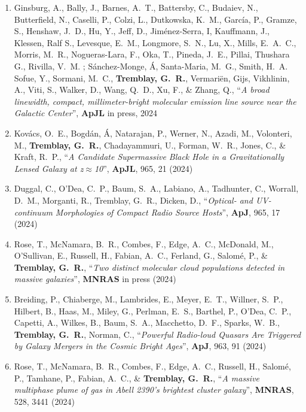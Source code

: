 \documentclass[11pt]{article}
\begin{document}
\begin{enumerate}[resume]

\item Ginsburg, A., Bally, J., Barnes, A.~T., Battersby, C., Budaiev, N., Butterfield, N., Caselli, P., Colzi, L.,  Dutkowska, K.~M., Garc\'{i}a, P.,  Gramze, S.,  Henshaw, J.~D., Hu, Y.,  Jeff, D., Jim\'{e}nez-Serra, I, Kauffmann, J., Klessen, Ralf S., Levesque, E.~M., Longmore, S.~N., Lu, X., Mills, E.~A.~C., Morris, M.~R., Nogueras-Lara, F., Oka, T.,  Pineda, J.~E., Pillai, Thushara G.,  Rivilla, V.~M. ; S\'{a}nchez-Monge, \'{A}, Santa-Maria, M.~G., Smith, H.~A. Sofue, Y., Sormani, M.~C., \textbf{Tremblay, G.~R.}, Vermari\"{e}n, Gijs, Vikhlinin, A., Viti, S., Walker, D., Wang, Q.~D., Xu, F., \& Zhang, Q., ``\textit{A broad linewidth, compact, millimeter-bright molecular emission line source near the Galactic Center}'', \textbf{ApJL} in press, 2024

\item Kov\'{a}cs, O.~E., Bogd\'{a}n, \'{A}, Natarajan, P., Werner, N., Azadi, M., Volonteri, M., \textbf{Tremblay, G.~R.}, Chadayammuri, U., Forman, W.~R., Jones, C., \& Kraft, R.~P., ``\textit{A Candidate Supermassive Black Hole in a Gravitationally Lensed Galaxy at z$\approx$10}'', \textbf{ApJL}, 965, 21 (2024)

\item Duggal, C., O'Dea, C.~P., Baum, S.~A., Labiano, A., Tadhunter, C.,  Worrall, D.~M.,  Morganti, R., Tremblay, G.~R., Dicken, D., ``\textit{Optical- and UV-continuum Morphologies of Compact Radio Source Hosts}'', \textbf{ApJ}, 965, 17 (2024)

\item Rose, T., McNamara, B.~R., Combes, F., Edge, A.~C., McDonald, M., O'Sullivan, E.,  Russell, H.,  Fabian, A.~C., Ferland, G., Salom\'{e}, P., \& \textbf{Tremblay, G.~R.}, ``\textit{Two distinct molecular cloud populations detected in massive galaxies}'', \textbf{MNRAS} in press (2024)

\item Breiding, P., Chiaberge, M., Lambrides, E., Meyer, E.~T., Willner, S.~P., Hilbert, B., Haas, M., Miley, G., Perlman, E.~S., Barthel, P., O'Dea, C.~P., Capetti, A., Wilkes, B., Baum, S.~A., Macchetto, D.~F., Sparks, W.~B., \textbf{Tremblay, G.~R.}, Norman, C., ``\textit{Powerful Radio-loud Quasars Are Triggered by Galaxy Mergers in the Cosmic Bright Ages}'', \textbf{ApJ}, 963, 91 (2024)

\item Rose, T.,  McNamara, B.~R.,  Combes, F.,  Edge, A.~C., Russell, H., Salom\'{e}, P., Tamhane, P., Fabian, A.~C., \& \textbf{Tremblay, G.~R.}, ``\textit{A massive multiphase plume of gas in Abell 2390's brightest cluster galaxy}'', \textbf{MNRAS}, 528, 3441 (2024)


\end{enumerate}
\end{document}
